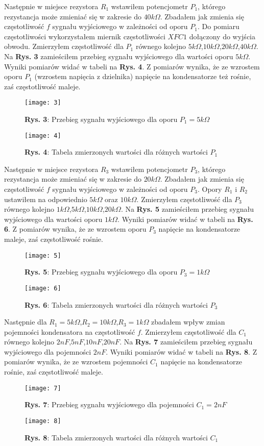 \documentclass[12pt]{article}
\begin{document}
\noindent Następnie w miejsce rezystora $R_1$ wstawiłem potencjometr $P_1$, którego rezystancja może zmieniać się w zakresie do $40k\Omega$. Zbadałem jak zmienia się częstotliwość $f$ sygnału wyjściowego w zależności od oporu $P_1$. Do pomiaru częstotliwości wykorzystałem miernik częstotliwości $XFC1$ dołączony do wyjścia obwodu. Zmierzyłem częstotliwość dla $P_1$ równego kolejno $5k\Omega$,$10k\Omega$,$20k\Omega$,$40k\Omega$. Na \textbf{Rys. 3} zamieściłem przebieg sygnału wyjściowego dla wartości oporu $5k\Omega$.
Wyniki pomiarów widać w tabeli na \textbf{Rys. 4}. Z pomiarów wynika, że ze wzrostem oporu $P_1$ (wzrostem napięcia z dzielnika) napięcie na kondensatorze też rośnie, zaś częstotliwość maleje.
\begin{figure}[H]
\centering
\texttt{[image: 3]}
\caption*{\textbf{Rys. 3}: Przebieg sygnału wyjściowego dla oporu $P_1=5k\Omega$ }
\end{figure}
\begin{figure}[H]
\centering
\texttt{[image: 4]}
\caption*{\textbf{Rys. 4}: Tabela zmierzonych wartości dla różnych wartości $P_1$ }
\end{figure}
\noindent Następnie w miejsce rezystora $R_3$ wstawiłem potencjometr $P_3$, którego rezystancja może zmieniać się w zakresie do $20k\Omega$. Zbadałem jak zmienia się częstotliwość $f$ sygnału wyjściowego w zależności od oporu $P_3$. Opory $R_1$ i $R_2$ ustawiłem na odpowiednio $5k\Omega$ oraz $10k\Omega$. Zmierzyłem częstotliwość dla $P_3$ równego kolejno $1k\Omega$,$5k\Omega$,$10k\Omega$,$20k\Omega$. Na \textbf{Rys. 5} zamieściłem przebieg sygnału wyjściowego dla wartości oporu $1k\Omega$. Wyniki pomiarów widać w tabeli na \textbf{Rys. 6}. Z pomiarów wynika, że ze wzrostem oporu $P_3$ napięcie na kondensatorze maleje, zaś częstotliwość rośnie.
\begin{figure}[H]
\centering
\texttt{[image: 5]}
\caption*{\textbf{Rys. 5}: Przebieg sygnału wyjściowego dla oporu $P_3=1k\Omega$ }
\end{figure}
\begin{figure}[H]
\centering
\texttt{[image: 6]}
\caption*{\textbf{Rys. 6}: Tabela zmierzonych wartości dla różnych wartości $P_3$ }
\end{figure}
\noindent Następnie dla $R_1=5k\Omega$,$R_2=10k\Omega$,$R_3=1k\Omega$ zbadałem wpływ zmian pojemności kondensatora na częstotliwość $f$. Zmierzyłem częstotliwość dla $C_1$ równego kolejno $2nF$,$5nF$,$10nF$,$20nF$.  Na \textbf{Rys. 7} zamieściłem przebieg sygnału wyjściowego dla pojemności $2nF$. Wyniki pomiarów widać w tabeli na \textbf{Rys. 8}. Z pomiarów wynika, że ze wzrostem pojemności $C_1$ napięcie na kondensatorze rośnie, zaś częstotliwość maleje.
\begin{figure}[H]
\centering
\texttt{[image: 7]}
\caption*{\textbf{Rys. 7}: Przebieg sygnału wyjściowego dla pojemności $C_1=2nF$ }
\end{figure}
\begin{figure}[H]
\centering
\texttt{[image: 8]}
\caption*{\textbf{Rys. 8}: Tabela zmierzonych wartości dla różnych wartości $C_1$ }
\end{figure}
\end{document}
